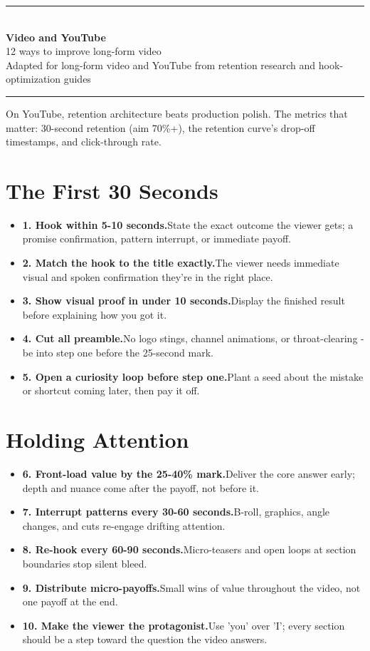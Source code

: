 \documentclass[11pt]{article}
\newcommand{\tip}[2]{\item \textbf{#1.}\enspace #2}
\newcommand{\tlabel}{\textcolor{accent}{\small$\blacktriangleright$}}
\newcommand{\footertitle}{Content Creation Playbook}
\newcommand{\docbanner}[3]{%
  \begin{center}
    {\color{accent}\rule{\textwidth}{1.4pt}}\\[10pt]
    {\Huge\bfseries\color{black} #1}\\[8pt]
    {\large\color{softgray} #2}\\[8pt]
    {\small\color{softgray} #3}\\[6pt]
    {\color{accent}\rule{\textwidth}{1.4pt}}
  \end{center}
  \vspace{6pt}
}
\begin{document}
\renewcommand{\footertitle}{Video and YouTube}
\docbanner{Video and YouTube}{12 ways to improve long-form video}{Adapted for long-form video and YouTube from retention research and hook-optimization guides}
\begin{tcolorbox}[colback=accent!5,colframe=accent,boxrule=0.8pt,arc=2pt,left=8pt,right=8pt,top=6pt,bottom=6pt]
\small On YouTube, retention architecture beats production polish. The metrics that matter: 30-second retention (aim 70\%+), the retention curve's drop-off timestamps, and click-through rate.
\end{tcolorbox}
\vspace{6pt}
\section*{The First 30 Seconds}
\begin{itemize}[label=\tlabel]
\tip{1. Hook within 5-10 seconds}{State the exact outcome the viewer gets; a promise confirmation, pattern interrupt, or immediate payoff.}
\tip{2. Match the hook to the title exactly}{The viewer needs immediate visual and spoken confirmation they're in the right place.}
\tip{3. Show visual proof in under 10 seconds}{Display the finished result before explaining how you got it.}
\tip{4. Cut all preamble}{No logo stings, channel animations, or throat-clearing - be into step one before the 25-second mark.}
\tip{5. Open a curiosity loop before step one}{Plant a seed about the mistake or shortcut coming later, then pay it off.}
\end{itemize}
\section*{Holding Attention}
\begin{itemize}[label=\tlabel]
\tip{6. Front-load value by the 25-40\% mark}{Deliver the core answer early; depth and nuance come after the payoff, not before it.}
\tip{7. Interrupt patterns every 30-60 seconds}{B-roll, graphics, angle changes, and cuts re-engage drifting attention.}
\tip{8. Re-hook every 60-90 seconds}{Micro-teasers and open loops at section boundaries stop silent bleed.}
\tip{9. Distribute micro-payoffs}{Small wins of value throughout the video, not one payoff at the end.}
\tip{10. Make the viewer the protagonist}{Use 'you' over 'I'; every section should be a step toward the question the video answers.}
\end{itemize}
\end{document}
